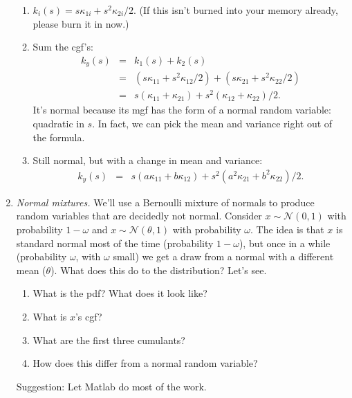 \documentclass[11pt]{article}
\begin{document}
\begin{enumerate}
\begin{enumerate}
\item $  k_i(s) = s \kappa_{1i} + s^2 \kappa_{2i}/2 $.
(If this isn't burned into your memory already, please burn it in now.)
\item Sum the cgf's:
\begin{eqnarray*}
    k_y(s) &=& k_1(s) + k_2(s) \\
            &=& (s \kappa_{11} + s^2 \kappa_{12}/2) + (s\kappa_{21} + s^2 \kappa_{22}/2) \\
            &=& s (\kappa_{11} + \kappa_{21} )
                + s^2 (\kappa_{12} + \kappa_{22})/2 .
\end{eqnarray*}
It's normal because its mgf has the form of a normal random variable:
quadratic in $s$.
In fact, we can pick the mean and variance right out of the formula.
\item Still normal, but with a change in mean and variance:
\begin{eqnarray*}
    k_y(s) &=& s (a \kappa_{11} + b \kappa_{12} )
                + s^2 (a^2 \kappa_{21} + b^2 \kappa_{22})/2  .
\end{eqnarray*}
\end{enumerate}


\item {\it Normal mixtures.\/}
We'll use a Bernoulli mixture of normals to produce
random variables that are decidedly not normal.
Consider $x \sim \mathcal{N}(0,1)$
with probability $1-\omega$
and $x \sim \mathcal{N}(\theta,1)$ with probability $\omega$.
The idea is that $x$ is standard normal most of the time (probability $1-\omega$),
but once in a while (probability $\omega$, with $\omega$ small)
we get a draw from a normal with a different mean ($\theta$).
What does this do to the distribution?
Let's see.
%
\begin{enumerate}
\item What is the pdf?  What does it look like?
\item What is $x$'s cgf?
\item What are the first three cumulants?
\item How does this differ from a normal random variable?
\end{enumerate}
Suggestion:  Let Matlab do most of the work.


\end{enumerate}
\end{document}
